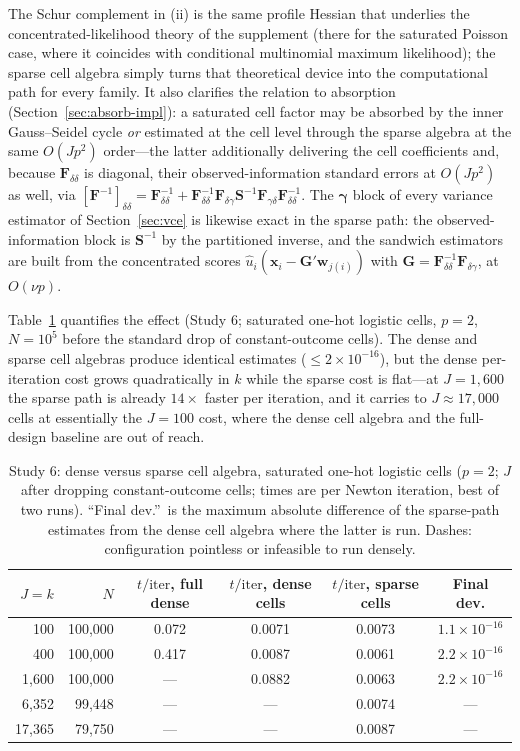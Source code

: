 \documentclass[11pt]{article}
\newcommand{\bgamma}{\bm{\gamma}}
\newcommand{\bx}{\mathbf{x}}
\newcommand{\bw}{\mathbf{w}}
\newcommand{\bF}{\mathbf{F}}
\newcommand{\bS}{\mathbf{S}}
\newcommand{\bG}{\mathbf{G}}
\begin{document}
The Schur complement in (ii) is the same profile Hessian that underlies
the concentrated-likelihood theory of the supplement (there for the
saturated Poisson case, where it coincides with conditional multinomial
maximum likelihood); the sparse cell algebra simply turns that
theoretical device into the computational path for every family.  It
also clarifies the relation to absorption
(Section~\ref{sec:absorb-impl}): a saturated cell factor may be
absorbed by the inner Gauss--Seidel cycle \emph{or} estimated at the
cell level through the sparse algebra at the same $O(Jp^2)$ order---the
latter additionally delivering the cell coefficients and, because
$\bF_{\delta\delta}$ is diagonal, their observed-information standard
errors at $O(Jp^2)$ as well, via
$[\bF^{-1}]_{\delta\delta} = \bF_{\delta\delta}^{-1} +
\bF_{\delta\delta}^{-1}\bF_{\delta\gamma}\bS^{-1}
\bF_{\gamma\delta}\bF_{\delta\delta}^{-1}$.  The $\bgamma$ block of
every variance estimator of Section~\ref{sec:vce} is likewise exact in
the sparse path: the observed-information block is $\bS^{-1}$ by the
partitioned inverse, and the sandwich estimators are built from the
concentrated scores
$\hat u_i(\bx_i - \bG'\bw_{j(i)})$ with
$\bG = \bF_{\delta\delta}^{-1}\bF_{\delta\gamma}$, at $O(\nu p)$.

Table~\ref{tab:sim6} quantifies the effect (Study 6; saturated one-hot
logistic cells, $p = 2$, $N = 10^5$ before the standard drop of
constant-outcome cells).  The dense and sparse cell algebras produce
identical estimates ($\le 2\times10^{-16}$), but the dense
per-iteration cost grows quadratically in $k$ while the sparse cost is
flat---at $J = 1{,}600$ the sparse path is already $14\times$ faster
per iteration, and it carries to $J \approx 17{,}000$ cells at
essentially the $J = 100$ cost, where the dense cell algebra and the
full-design baseline are out of reach.

\begin{table}[t]
\centering
\caption{Study 6: dense versus sparse cell algebra, saturated one-hot
logistic cells ($p = 2$; $J$ after dropping constant-outcome cells;
times are per Newton iteration, best of two runs).  ``Final dev.''\ is
the maximum absolute difference of the sparse-path estimates from the
dense cell algebra where the latter is run.  Dashes: configuration
pointless or infeasible to run densely.}
\label{tab:sim6}
\small
\begin{tabular}{rrcccc}
\toprule
$J = k$ & $N$ & $t/\mathrm{iter}$, full dense &
$t/\mathrm{iter}$, dense cells & $t/\mathrm{iter}$, sparse cells &
Final dev. \\
\midrule
100     & 100{,}000 & 0.072 & 0.0071 & 0.0073 & $1.1\times10^{-16}$ \\
400     & 100{,}000 & 0.417 & 0.0087 & 0.0061 & $2.2\times10^{-16}$ \\
1{,}600 & 100{,}000 & ---   & 0.0882 & 0.0063 & $2.2\times10^{-16}$ \\
6{,}352 & 99{,}448  & ---   & ---    & 0.0074 & --- \\
17{,}365 & 79{,}750 & ---   & ---    & 0.0087 & --- \\
\bottomrule
\end{tabular}
\end{table}
\end{document}

